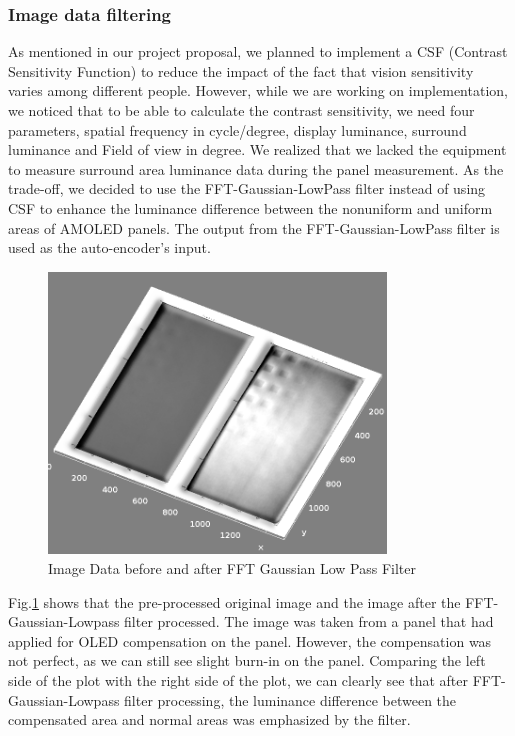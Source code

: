 \documentclass[runningheads]{llncs}
\begin{document}
\subsubsection{Image data filtering\\}
As mentioned in our project proposal, we planned to implement a CSF (Contrast Sensitivity Function) to reduce the impact of the fact that vision sensitivity varies among different people. However, while we are working on implementation, we noticed that to be able to calculate the contrast sensitivity, we need four parameters, spatial frequency in cycle/degree, display luminance, surround luminance and Field of view in degree. We realized that we lacked the equipment to measure surround area luminance data during the panel measurement. As the trade-off, we decided to use the FFT-Gaussian-LowPass filter instead of using CSF to enhance the luminance difference between the nonuniform and uniform areas of AMOLED panels. The output from the FFT-Gaussian-LowPass filter is used as the auto-encoder’s input.

\begin{figure}
    \centering
    \includegraphics[width=0.8\textwidth]{Surface_Plot_of_3D_plot_resized_fft_lowpass.png}
    \caption{Image Data before and after FFT Gaussian Low Pass Filter}
    \label{3Dplot}
\end{figure}


Fig.\ref{3Dplot} shows that the pre-processed original image and the image after the FFT-Gaussian-Lowpass filter processed. The image was taken from a panel that had applied for OLED compensation on the panel. However, the compensation was not perfect, as we can still see slight burn-in on the panel. Comparing the left side of the plot with the right side of the plot, we can clearly see that after FFT-Gaussian-Lowpass filter processing, the luminance difference between the compensated area and normal areas was emphasized by the filter.
\end{document}
